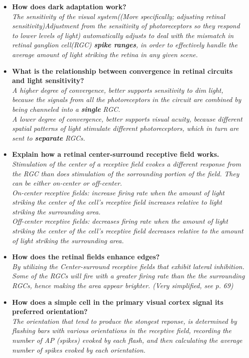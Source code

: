 \documentclass{article}
\begin{document}
\begin{itemize}
    \item \textbf{How does dark adaptation work?}\\
      \textit{The sensitivity of the visual system((More specifically; adjusting retinal sensitivity)Adjustment from the sensitivity of photoreceptors so they respond to lower levels of light) automatically adjusts to deal with the mismatch in retinal ganglion cell(RGC) \textbf{spike ranges}, in order to effectively handle the average amount of light striking the retina in any given scene.}
    \item \textbf{What is the relationship between convergence in retinal circuits and light sensitivity?}\\
      \textit{A higher degree of convergence, better supports sensitivity to dim light, because the signals from all the photoreceptors in the circuit are combined by being channeled into a \textbf{single} RGC.\\A lower degree of convergence, better supports visual acuity, because different spatial patterns of light stimulate different photoreceptors, which in turn are sent to \textbf{separate} RGCs.}
    \item \textbf{Explain how a retinal center-surround receptive field works.}\\
      \textit{Stimulation of the center of a receptive field evokes a different response from the RGC than does stimulation of the sorrounding portion of the field. They can be either on-center or off-center.\\On-center receptive fields: increase firing rate when the amount of light striking the center of the cell's receptive field increases relative to light striking the surrounding area.\\Off-center receptive fields: decreases firing rate when the amount of light striking the center of the cell's receptive field decreases relative to the amount of light striking the surrounding area.}
    \item \textbf{How does the retinal fields enhance edges?}\\
      \textit{By utilizing the Center-surround receptive fields that exhibit lateral inhibition. Some of the RGCs will fire with a greater firing rate than the the surrounding RGCs, hence making the area appear brighter. (Very simplified, see p. 69)}
    \item \textbf{How does a simple cell in the primary visual cortex signal its preferred orientation?}\\
      \textit{The orientation that tend to produce the stongest reponse, is determined by flashing bars with various orientations in the receptive field, recording the number of AP (spikes) evoked by each flash, and then calculating the average number of spikes evoked by each orientation.}
\end{itemize}
\end{document}
